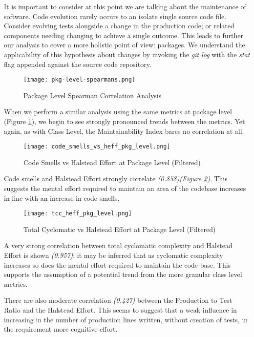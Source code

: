 It is important to consider at this point we are talking about the maintenance of software. Code evolution rarely occurs to an isolate single source code file. Consider evolving tests alongside a change in the production code; or related components needing changing to achieve a single outcome. This leads to further our analysis to cover a more holistic point of view: packages. We understand the applicability of this hypothesis about changes by invoking the \textit{git log} with the \textit{stat} flag appended against the source code repository.


\begin{figure}[H]
	\texttt{[image: pkg-level-spearmans.png]}
	\caption{Package Level Spearman Correlation Analysis}
	\label{fig:pkgLevelSpearmans}  
\end{figure}

When we perform a similar analysis using the same metrics at package level (Figure \ref{fig:pkgLevelSpearmans}), we begin to see strongly pronounced trends between the metrics. Yet again, as with Class Level, the Maintainability Index bares no correlation at all.

\begin{figure}[H]
	\texttt{[image: code\_smells\_vs\_heff\_pkg\_level.png]}
	\caption{Code Smells vs Halstead Effort at Package Level (Filtered)}
	\label{fig:codeSmellsHeffPkg}  
\end{figure}

Code smells and Halstead Effort strongly correlate \textit{(0.858)(Figure \ref{fig:codeSmellsHeffPkg})}. This suggests the mental effort required to maintain an area of the codebase increases in line with an increase in code smells. 

\begin{figure}[H]
	\texttt{[image: tcc\_heff\_pkg\_level.png]}
	\caption{Total Cyclomatic vs Halstead Effort at Package Level (Filtered)}
	\label{fig:tccHeffPkg}  
\end{figure}

A very strong correlation between total cyclomatic complexity and Halstead Effort is shown \textit{(0.957)}; it may be inferred that as cyclomatic complexity increases so does the mental effort required to maintain the code-base. This supports the assumption of a potential trend from the more granular class level metrics.

There are also moderate correlation \textit{(0.427)} between the Production to Test Ratio and the Halstead Effort. This seems to suggest that a weak influence in increasing in the number of production lines written, without creation of tests, in the requirement more cognitive effort.

